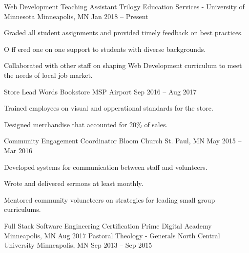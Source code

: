 \documentclass[]{awesome-cv}
\begin{document}
\begin{cventries}
	\cventry
	{Web Development Teaching Assistant}
	{Trilogy Education Services - University of Minnesota}
	{Minneapolis, MN}
	{Jan 2018 – Present}
	{\begin{cvitems}
		\item {Graded all student assignments and provided timely feedback on best practices.}
		\item {O ff ered one on one support to students with diverse backgrounds.}
		\item {Collaborated with other staff on shaping Web Development curriculum to meet the needs of local job market.}
		\end{cvitems}}
	\cventry
	{Store Lead}
	{Words Bookstore}
	{MSP Airport}
	{Sep 2016 – Aug 2017}
	{\begin{cvitems}
		\item {Trained employees on visual and opperational standards for the store.}
		\item {Designed merchandise that accounted for 20\% of sales.}
		\end{cvitems}}
	\cventry
	{Community Engagement Coordinator}
	{Bloom Church}
	{St. Paul, MN}
	{May 2015 – Mar 2016}
	{\begin{cvitems}
		\item {Developed systems for communication between staff and volunteers.}
		\item {Wrote and delivered sermons at least monthly.}
		\item {Mentored community voluneteers on strategies for leading small group curriculums.}
		\end{cvitems}}
\end{cventries}
\begin{cventries}
	\cventry
	{Full Stack Software Engineering Certification}
	{Prime Digital Academy}
	{Minneapolis, MN}
	{Aug 2017}
	{}
	\cventry
	{Pastoral Theology - Generals}
	{North Central University}
	{Minneapolis, MN}
	{Sep 2013 – Sep 2015}
	{}
\end{cventries}

\vspace{-2mm}

\
\end{document}
